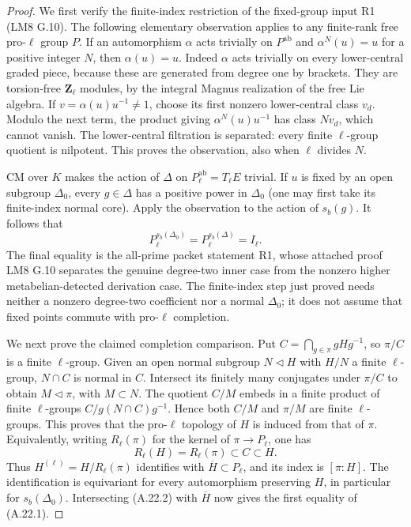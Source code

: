 \begin{proof}
We first verify the finite-index restriction of the fixed-group
input R1 (LM8 G.10). The following elementary observation applies
to any finite-rank free pro-$\ell$ group $P$. If an automorphism
$\alpha$ acts trivially on $P^{\mathrm{ab}}$ and
$\alpha^N(u)=u$ for a positive integer $N$, then $\alpha(u)=u$.
Indeed $\alpha$ acts trivially on every lower-central graded
piece, because these are generated from degree one by brackets.
They are torsion-free $\mathbf Z_\ell$ modules, by the integral
Magnus realization of the free Lie algebra. If
$v=\alpha(u)u^{-1}\ne1$, choose its first nonzero lower-central
class $v_d$. Modulo the next term, the product giving
$\alpha^N(u)u^{-1}$ has class $Nv_d$, which cannot vanish.
The lower-central filtration is separated: every finite
$\ell$-group quotient is nilpotent. This proves the observation,
also when $\ell$ divides $N$.

CM over $K$ makes the action of $\Delta$ on
$P_\ell^{\mathrm{ab}}=T_\ell E$ trivial. If $u$ is fixed by an
open subgroup $\Delta_0$, every $g\in\Delta$ has a positive
power in $\Delta_0$ (one may first take its finite-index normal
core). Apply the observation to the action of $s_b(g)$.
It follows that
\[
           P_\ell^{s_b(\Delta_0)}
             =P_\ell^{s_b(\Delta)}=I_\ell.
                                                        \tag{A.22.2}
\]
The final equality is the all-prime packet statement R1,
whose attached proof LM8 G.10 separates the genuine degree-two
inner case from the nonzero higher metabelian-detected
derivation case. The finite-index step just proved needs
neither a nonzero degree-two coefficient nor a normal
$\Delta_0$; it does not assume that fixed points commute with
pro-$\ell$ completion.

We next prove the claimed completion comparison. Put
$C=\bigcap_{g\in\pi}gHg^{-1}$, so $\pi/C$ is a finite
$\ell$-group. Given an open normal subgroup $N\triangleleft H$
with $H/N$ a finite $\ell$-group, $N\cap C$ is normal in $C$.
Intersect its finitely many conjugates under $\pi/C$ to obtain
$M\triangleleft\pi$, with $M\subset N$.
The quotient $C/M$ embeds in a finite product of finite
$\ell$-groups $C/g(N\cap C)g^{-1}$. Hence both $C/M$ and
$\pi/M$ are finite $\ell$-groups. This proves that the
pro-$\ell$ topology of $H$ is induced from that of $\pi$.
Equivalently, writing $R_\ell(\pi)$ for the kernel of
$\pi\to P_\ell$, one has
\[
            R_\ell(H)=R_\ell(\pi)\subset C\subset H.
\]
Thus $H^{(\ell)}=H/R_\ell(\pi)$ identifies with
$\overline H\subset P_\ell$, and its index is $[\pi:H]$.
The identification is equivariant for every automorphism
preserving $H$, in particular for $s_b(\Delta_0)$.
Intersecting (A.22.2) with $\overline H$ now gives the first
equality of (A.22.1).


\end{proof}
